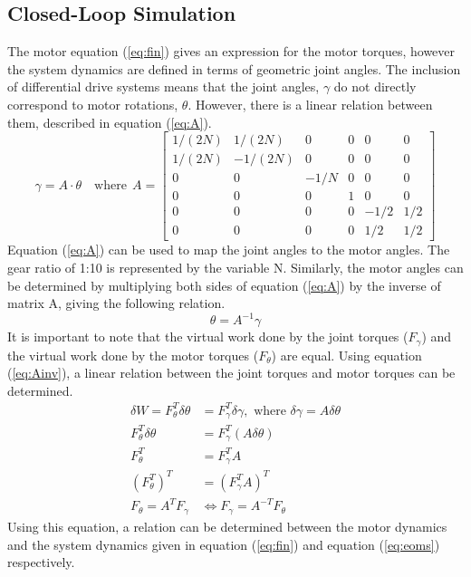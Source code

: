 \subsection{Closed-Loop Simulation}
The motor equation (\ref{eq:fin}) gives an expression for the motor torques, however the system dynamics are defined in terms of geometric joint angles. The inclusion of differential drive systems means that the joint angles, $\gamma$ do not directly correspond to motor rotations, $\theta$. However, there is a linear relation between them, described in equation (\ref{eq:A}).
\begin{equation}
  \gamma = A\cdot\theta\quad \text{where}~~A=\left[\begin{array}{cccccc}{1 /(2 N)} & {1 /(2 N)} & {0} & {0} & {0} & {0} \\ {1 /(2 N)} & {-1 /(2 N)} & {0} & {0} & {0} & {0} \\ {0} & {0} & {-1 / N} & {0} & {0} & {0} \\ {0} & {0} & {0} & {1} & {0} & {0} \\ {0} & {0} & {0} & {0} & {-1 / 2} & {1 / 2} \\ {0} & {0} & {0} & {0} & {1 / 2} & {1 / 2}\end{array}\right]
\label{eq:A}
\end{equation}
Equation (\ref{eq:A}) can be used to map the joint angles to the motor angles. The gear ratio of 1:10 is represented by the variable N. Similarly, the motor angles can be determined by multiplying both sides of equation (\ref{eq:A}) by the inverse of matrix A, giving the following relation.
\begin{equation}
\theta=A^{-1} \gamma
\label{eq:Ainv}
\end{equation}
It is important to note that the virtual work done by the joint torques ($F_{\gamma}$) and the virtual work done by the motor torques ($F_{\theta}$) are equal. Using equation (\ref{eq:Ainv}), a linear relation between the joint torques and motor torques can be determined.
\[
\begin{aligned}
  \delta W = F_{\theta}^{T} \delta \theta&=F_{\gamma}^{T} \delta \gamma, \text { where } \delta \gamma=A \delta \theta \\
  F_{\theta}^{T} \delta \theta &= F_{\gamma}^{T}(A \delta \theta) \\
  F_{\theta}^{T}&=F_{\gamma}^{T} A\\
  \left(F_{\theta}^{T}\right)^{T}&=\left(F_{\gamma}^{T} A\right)^{T}\\
  F_{\theta}=A^{T} F_{\gamma} &\Leftrightarrow F_{\gamma}=A^{-T} F_{\theta}\qquad\quad
\end{aligned}
\]
Using this equation, a relation can be determined between the motor dynamics and the system dynamics given in equation (\ref{eq:fin}) and equation (\ref{eq:eoms}) respectively.

